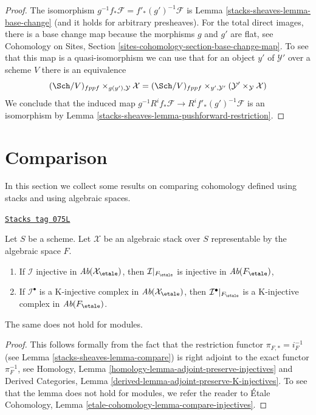 \begin{proof}
The isomorphism $g^{-1}f_*\mathcal{F} = f'_*(g')^{-1}\mathcal{F}$ is
Lemma \ref{stacks-sheaves-lemma-base-change} (and it holds for arbitrary presheaves).
For the total direct images, there is a base change map because the
morphisms $g$ and $g'$ are flat, see
Cohomology on Sites, Section \ref{sites-cohomology-section-base-change-map}.
To see that this map is a quasi-isomorphism we can use that for
an object $y'$ of $\mathcal{Y}'$ over a scheme $V$ there is an equivalence
$$
(\Sch/V)_{fppf} \times_{g(y'), \mathcal{Y}} \mathcal{X}
=
(\Sch/V)_{fppf} \times_{y', \mathcal{Y}'}
(\mathcal{Y}' \times_\mathcal{Y} \mathcal{X})
$$
We conclude that the induced map
$g^{-1}R^if_*\mathcal{F} \to R^if'_*(g')^{-1}\mathcal{F}$
is an isomorphism by
Lemma \ref{stacks-sheaves-lemma-pushforward-restriction}.
\end{proof}

\section{Comparison}
\label{stacks-sheaves-section-compare}
In this section we collect some results on comparing cohomology defined
using stacks and using algebraic spaces.

\begin{lemma}
\label{stacks-sheaves-lemma-compare-injectives}
\href{https://stacks.math.columbia.edu/tag/075L}{\texttt{Stacks tag 075L}}

Let $S$ be a scheme. Let $\mathcal{X}$ be an algebraic stack over $S$
representable by the algebraic space $F$.
\begin{enumerate}
\item If $\mathcal{I}$ injective in $\textit{Ab}(\mathcal{X}_\etale)$, then
$\mathcal{I}|_{F_\etale}$ is injective in $\textit{Ab}(F_\etale)$,
\item If $\mathcal{I}^\bullet$ is a K-injective complex in
$\textit{Ab}(\mathcal{X}_\etale)$, then $\mathcal{I}^\bullet|_{F_\etale}$
is a K-injective complex in $\textit{Ab}(F_\etale)$.
\end{enumerate}
The same does not hold for modules.
\end{lemma}

\begin{proof}
This follows formally from the fact that the restriction functor
$\pi_{F, *} = i_F^{-1}$ (see Lemma \ref{stacks-sheaves-lemma-compare})
is right adjoint to the exact functor $\pi_F^{-1}$, see
Homology, Lemma \ref{homology-lemma-adjoint-preserve-injectives} and
Derived Categories, Lemma \ref{derived-lemma-adjoint-preserve-K-injectives}.
To see that the lemma does not hold for modules, we refer the
reader to \'Etale Cohomology, Lemma
\ref{etale-cohomology-lemma-compare-injectives}.
\end{proof}

